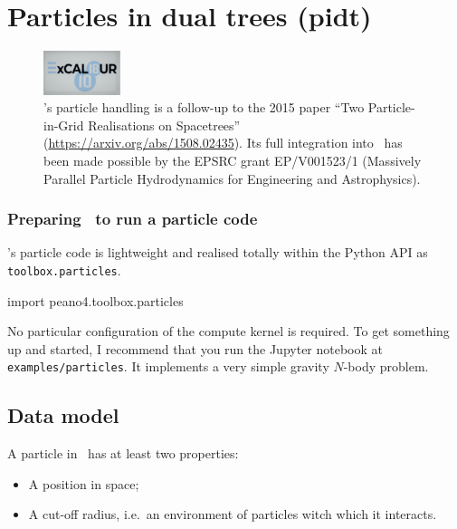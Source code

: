 \chapter{Particles in dual trees (pidt)}
\label{section:pidt}


\begin{figure}[htb]
 \begin{center}
  \includegraphics[width=0.2\textwidth]{61_pidt/ExCALIBUR.png}
 \end{center}
 \caption{
   \Peano's particle handling is a follow-up to the 2015 paper ``Two
   Particle-in-Grid Realisations on Spacetrees''
   (\url{https://arxiv.org/abs/1508.02435}).
   Its full integration into \Peano\ has been made possible by the EPSRC grant 
   EP/V001523/1 (Massively Parallel Particle Hydrodynamics for Engineering and
   Astrophysics).
  }
\end{figure}


\subsection*{Preparing \Peano\ to run a particle code}

\Peano's particle code is lightweight and realised totally within the Python
API as \texttt{toolbox.particles}.

\begin{code}
import peano4.toolbox.particles
\end{code}

No particular configuration of the compute kernel is required.
To get something up and started, I recommend that you run the Jupyter notebook
at \texttt{examples/particles}.
It implements a very simple gravity $N$-body problem.


\section{Data model}

A particle in \Peano\ has at least two properties:

\begin{itemize}
  \item A position in space;
  \item A cut-off radius, i.e.~an environment of particles witch which it
  interacts.
\end{itemize}

